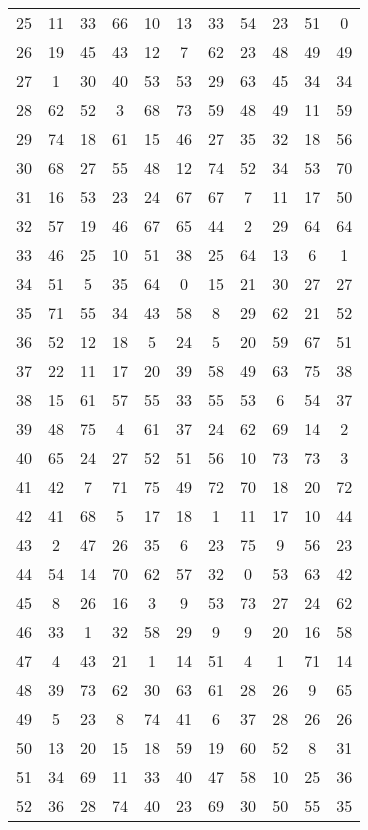\begin{table}
\begin{tabular}{c c c c c c c c c c c }
25 & 11 & 33 & 66 & 10 & 13 & 33 & 54 & 23 & 51 & 0 \\
26 & 19 & 45 & 43 & 12 & 7 & 62 & 23 & 48 & 49 & 49 \\
27 & 1 & 30 & 40 & 53 & 53 & 29 & 63 & 45 & 34 & 34 \\
28 & 62 & 52 & 3 & 68 & 73 & 59 & 48 & 49 & 11 & 59 \\
29 & 74 & 18 & 61 & 15 & 46 & 27 & 35 & 32 & 18 & 56 \\
30 & 68 & 27 & 55 & 48 & 12 & 74 & 52 & 34 & 53 & 70 \\
31 & 16 & 53 & 23 & 24 & 67 & 67 & 7 & 11 & 17 & 50 \\
32 & 57 & 19 & 46 & 67 & 65 & 44 & 2 & 29 & 64 & 64 \\
33 & 46 & 25 & 10 & 51 & 38 & 25 & 64 & 13 & 6 & 1 \\
34 & 51 & 5 & 35 & 64 & 0 & 15 & 21 & 30 & 27 & 27 \\
35 & 71 & 55 & 34 & 43 & 58 & 8 & 29 & 62 & 21 & 52 \\
36 & 52 & 12 & 18 & 5 & 24 & 5 & 20 & 59 & 67 & 51 \\
37 & 22 & 11 & 17 & 20 & 39 & 58 & 49 & 63 & 75 & 38 \\
38 & 15 & 61 & 57 & 55 & 33 & 55 & 53 & 6 & 54 & 37 \\
39 & 48 & 75 & 4 & 61 & 37 & 24 & 62 & 69 & 14 & 2 \\
40 & 65 & 24 & 27 & 52 & 51 & 56 & 10 & 73 & 73 & 3 \\
41 & 42 & 7 & 71 & 75 & 49 & 72 & 70 & 18 & 20 & 72 \\
42 & 41 & 68 & 5 & 17 & 18 & 1 & 11 & 17 & 10 & 44 \\
43 & 2 & 47 & 26 & 35 & 6 & 23 & 75 & 9 & 56 & 23 \\
44 & 54 & 14 & 70 & 62 & 57 & 32 & 0 & 53 & 63 & 42 \\
45 & 8 & 26 & 16 & 3 & 9 & 53 & 73 & 27 & 24 & 62 \\
46 & 33 & 1 & 32 & 58 & 29 & 9 & 9 & 20 & 16 & 58 \\
47 & 4 & 43 & 21 & 1 & 14 & 51 & 4 & 1 & 71 & 14 \\
48 & 39 & 73 & 62 & 30 & 63 & 61 & 28 & 26 & 9 & 65 \\
49 & 5 & 23 & 8 & 74 & 41 & 6 & 37 & 28 & 26 & 26 \\
50 & 13 & 20 & 15 & 18 & 59 & 19 & 60 & 52 & 8 & 31 \\
51 & 34 & 69 & 11 & 33 & 40 & 47 & 58 & 10 & 25 & 36 \\
52 & 36 & 28 & 74 & 40 & 23 & 69 & 30 & 50 & 55 & 35 \\

\end{tabular}
\end{table}
